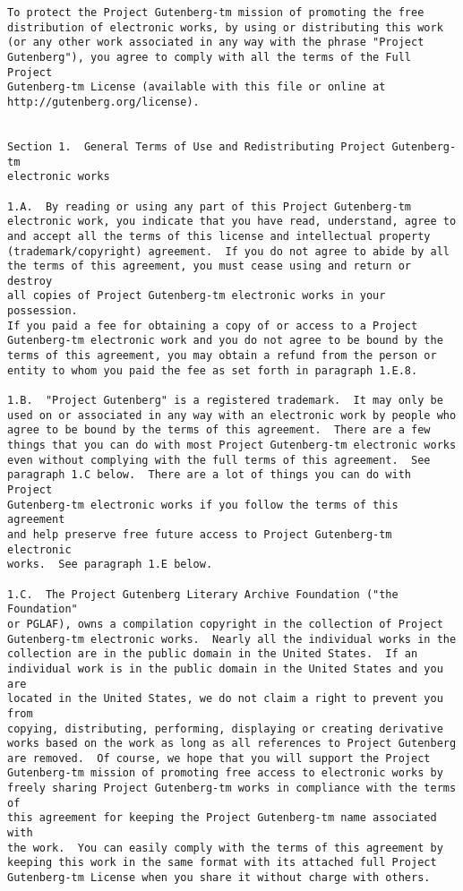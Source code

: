 \documentclass[12pt,oneside]{book}
\begin{document}
\begin{verbatim}
To protect the Project Gutenberg-tm mission of promoting the free
distribution of electronic works, by using or distributing this work
(or any other work associated in any way with the phrase "Project
Gutenberg"), you agree to comply with all the terms of the Full Project
Gutenberg-tm License (available with this file or online at
http://gutenberg.org/license).


Section 1.  General Terms of Use and Redistributing Project Gutenberg-tm
electronic works

1.A.  By reading or using any part of this Project Gutenberg-tm
electronic work, you indicate that you have read, understand, agree to
and accept all the terms of this license and intellectual property
(trademark/copyright) agreement.  If you do not agree to abide by all
the terms of this agreement, you must cease using and return or destroy
all copies of Project Gutenberg-tm electronic works in your possession.
If you paid a fee for obtaining a copy of or access to a Project
Gutenberg-tm electronic work and you do not agree to be bound by the
terms of this agreement, you may obtain a refund from the person or
entity to whom you paid the fee as set forth in paragraph 1.E.8.

1.B.  "Project Gutenberg" is a registered trademark.  It may only be
used on or associated in any way with an electronic work by people who
agree to be bound by the terms of this agreement.  There are a few
things that you can do with most Project Gutenberg-tm electronic works
even without complying with the full terms of this agreement.  See
paragraph 1.C below.  There are a lot of things you can do with Project
Gutenberg-tm electronic works if you follow the terms of this agreement
and help preserve free future access to Project Gutenberg-tm electronic
works.  See paragraph 1.E below.

1.C.  The Project Gutenberg Literary Archive Foundation ("the Foundation"
or PGLAF), owns a compilation copyright in the collection of Project
Gutenberg-tm electronic works.  Nearly all the individual works in the
collection are in the public domain in the United States.  If an
individual work is in the public domain in the United States and you are
located in the United States, we do not claim a right to prevent you from
copying, distributing, performing, displaying or creating derivative
works based on the work as long as all references to Project Gutenberg
are removed.  Of course, we hope that you will support the Project
Gutenberg-tm mission of promoting free access to electronic works by
freely sharing Project Gutenberg-tm works in compliance with the terms of
this agreement for keeping the Project Gutenberg-tm name associated with
the work.  You can easily comply with the terms of this agreement by
keeping this work in the same format with its attached full Project
Gutenberg-tm License when you share it without charge with others.


\end{verbatim}
\end{document}

